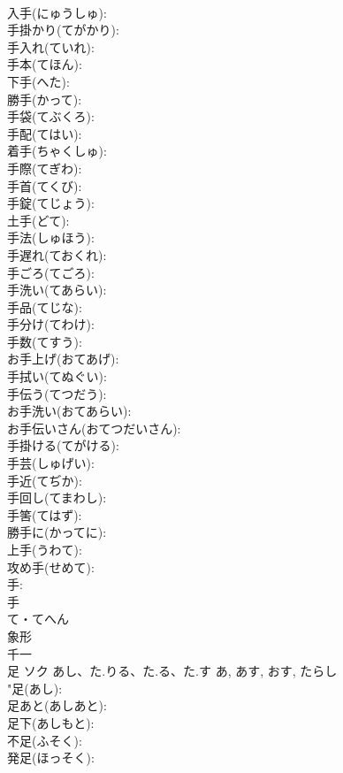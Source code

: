 \documentclass[8pt]{extreport}
\begin{document}
\begin{CJK}{UTF8}{min}
\\	入手(にゅうしゅ): 
\\	手掛かり(てがかり): 
\\	手入れ(ていれ): 
\\	手本(てほん): 
\\	下手(へた): 
\\	勝手(かって): 
\\	手袋(てぶくろ): 
\\	手配(てはい): 
\\	着手(ちゃくしゅ): 
\\	手際(てぎわ): 
\\	手首(てくび): 
\\	手錠(てじょう): 
\\	土手(どて): 
\\	手法(しゅほう): 
\\	手遅れ(ておくれ): 
\\	手ごろ(てごろ): 
\\	手洗い(てあらい): 
\\	手品(てじな): 
\\	手分け(てわけ): 
\\	手数(てすう): 
\\	お手上げ(おてあげ): 
\\	手拭い(てぬぐい): 
\\	手伝う(てつだう): 
\\	お手洗い(おてあらい): 
\\	お手伝いさん(おてつだいさん): 
\\	手掛ける(てがける): 
\\	手芸(しゅげい): 
\\	手近(てぢか): 
\\	手回し(てまわし): 
\\	手筈(てはず): 
\\	勝手に(かってに): 
\\	上手(うわて): 
\\	攻め手(せめて): 
\\	手: 
\\	手	
\\	て・てへん	
\\	象形 
\\	千一
\\	足	ソク	あし、た.りる、た.る、た.す	あ, あす, おす, たらし	
\\	"足(あし): 
\\	足あと(あしあと): 
\\	足下(あしもと): 
\\	不足(ふそく): 
\\	発足(ほっそく): 

\end{CJK}
\end{document}

